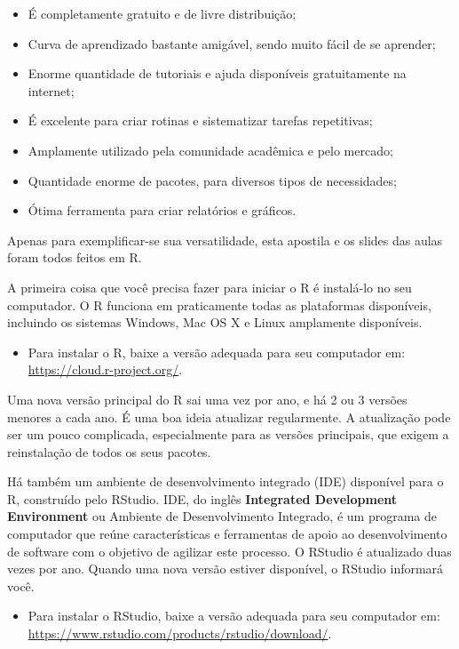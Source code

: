 \documentclass[]{book}
\providecommand{\tightlist}{%
  \setlength{\itemsep}{0pt}\setlength{\parskip}{0pt}}
\begin{document}
\begin{itemize}
\tightlist
\item
  É completamente gratuito e de livre distribuição;
\item
  Curva de aprendizado bastante amigável, sendo muito fácil de se aprender;
\item
  Enorme quantidade de tutoriais e ajuda disponíveis gratuitamente na internet;
\item
  É excelente para criar rotinas e sistematizar tarefas repetitivas;
\item
  Amplamente utilizado pela comunidade acadêmica e pelo mercado;
\item
  Quantidade enorme de pacotes, para diversos tipos de necessidades;
\item
  Ótima ferramenta para criar relatórios e gráficos.
\end{itemize}

Apenas para exemplificar-se sua versatilidade, esta apostila e os slides das aulas foram todos feitos em R.

A primeira coisa que você precisa fazer para iniciar o R é instalá-lo no seu computador. O R funciona em praticamente todas as plataformas disponíveis, incluindo os sistemas Windows, Mac OS X e Linux amplamente disponíveis.

\begin{itemize}
\tightlist
\item
  Para instalar o R, baixe a versão adequada para seu computador em: \url{https://cloud.r-project.org/}.
\end{itemize}

Uma nova versão principal do R sai uma vez por ano, e há 2 ou 3 versões menores a cada ano. É uma boa ideia atualizar regularmente. A atualização pode ser um pouco complicada, especialmente para as versões principais, que exigem a reinstalação de todos os seus pacotes.

Há também um ambiente de desenvolvimento integrado (IDE) disponível para o R, construído pelo RStudio. IDE, do inglês \textbf{Integrated Development Environment} ou Ambiente de Desenvolvimento Integrado, é um programa de computador que reúne características e ferramentas de apoio ao desenvolvimento de software com o objetivo de agilizar este processo. O RStudio é atualizado duas vezes por ano. Quando uma nova versão estiver disponível, o RStudio informará você.

\begin{itemize}
\tightlist
\item
  Para instalar o RStudio, baixe a versão adequada para seu computador em: \url{https://www.rstudio.com/products/rstudio/download/}.
\end{itemize}
\end{document}
